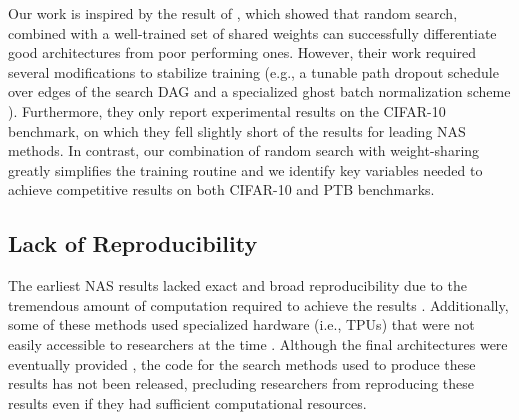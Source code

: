 \documentclass[acmlarge, nonacm]{acmart}
\begin{document}
Our work is inspired by the result of \citet{bender2018understanding}, which showed that random search, combined with a well-trained set of shared weights can successfully differentiate good architectures from poor performing ones. However, their work required several modifications to stabilize training (e.g., a tunable path dropout schedule over edges of the search DAG and a specialized ghost batch normalization scheme \citep{Hoffer2017TrainLG}).   Furthermore, they only report experimental results on the CIFAR-10 benchmark, on which they fell slightly short of the results for leading NAS methods. In contrast, our combination of random search with weight-sharing greatly simplifies the training routine and we identify key variables needed to achieve competitive results on both CIFAR-10 and PTB benchmarks.

\subsection{Lack of Reproducibility}
The earliest NAS results lacked exact and broad reproducibility due to the tremendous amount of computation required to achieve the results \citep{nasRL,Zoph2018LearningTA, Real2018}.  Additionally, some of these methods used specialized hardware (i.e., TPUs) that were not easily accessible 
to researchers at the time \citep{Real2018}.  Although the final architectures were eventually provided \citep{nasnetcode, amoebanetcode}, the code for the search methods used to produce these results has not been released, precluding researchers from reproducing these results even if they had sufficient computational resources. 
\end{document}

